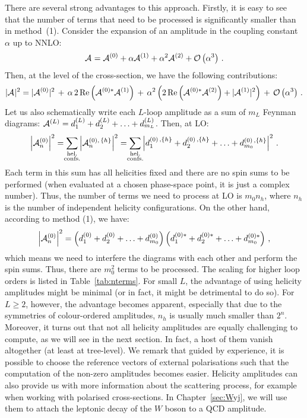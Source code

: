 \documentclass[main.tex]{subfiles}
\begin{document}
There are several strong advantages to this approach. Firstly, it is easy to see that the number of terms that need to be processed is significantly smaller than in method~(1). Consider the expansion of an amplitude in the coupling constant $\alpha$ up to NNLO:
\begin{equation}
    \mathcal{A}_{}^{} = \mathcal{A}_{}^{(0)} + \alpha \mathcal{A}_{}^{(1)} + \alpha^2 \mathcal{A}_{}^{(2)} + \mathcal{O}\left(\alpha^3\right) \,.
\end{equation}
Then, at the level of the cross-section, we have the following contributions:
\begin{equation}
    |\mathcal{A}_{}^{}|^2 = |\mathcal{A}_{}^{(0)}|^2 \,+\,\alpha\,2\,\mathrm{Re}\left(\mathcal{A}_{}^{(0)\ast}\mathcal{A}_{}^{(1)}\right) \,+\, \alpha^2 \left(2\,\mathrm{Re} \left(\mathcal{A}_{}^{(0)\ast}\mathcal{A}_{}^{(2)}\right) + |\mathcal{A}_{}^{(1)}|^2 \right) \,+\, \mathcal{O}\left(\alpha^3\right)\,.
\end{equation}
Let us also schematically write each $L$-loop amplitude as a sum of $m_L$ Feynman diagrams: $\mathcal{A}_{}^{(L)} = d^{(L)}_1 + d^{(L)}_2 + \ldots + d^{(L)}_{m_L}$. Then, at LO:
\begin{equation}
    \left|\ampl{n}{(0)}\right|^2 = \sum_{\mathclap{\substack{\text{hel.} \\ \text{confs.}}}} \left|\ampl{n}{(0),\,\{h\}} \right|^2 = \sum_{\mathclap{\substack{\text{hel.} \\ \text{confs.}}}} \left|d^{(0)\,,\{h\}}_1 + d^{(0)\,,\{h\}}_2 + \ldots + d^{(0)\,,\{h\}}_{m_0} \right|^2 \,.
\end{equation}
Each term in this sum has all helicities fixed and there are no spin sums to be performed (when evaluated at a chosen phase-space point, it is just a complex number). Thus, the number of terms we need to process at LO is $m_0 n_h$, where $n_h$ is the number of independent helicity configurations. On the other hand, according to method (1), we have:
\begin{equation}
    \left|\mathcal{A}_{n}^{(0)}\right|^2 = \left(d^{(0)}_1 + d^{(0)}_2 + \ldots + d^{(0)}_{m_0} \right) \left(d^{(0)\ast}_1 + d^{(0)\ast}_2 + \ldots + d^{(0)\ast}_{m_0} \right)\,,
\end{equation}
which means we need to interfere the diagrams with each other and perform the spin sums. Thus, there are $m_0^2$ terms to be processed. The scaling for higher loop orders is listed in Table~\ref{tab:nterms}. For small $L$, the advantage of using helicity amplitudes might be minimal (or in fact, it might be detrimental to do so). For $L\geq2$, however, the advantage becomes apparent, especially that due to the symmetries of colour-ordered amplitudes, $n_h$ is usually much smaller than $2^n$. Moreover, it turns out that not all helicity amplitudes are equally challenging to compute, as we will see in the next section. In fact, a host of them vanish altogether (at least at tree-level). We remark that guided by experience, it is possible to choose the reference vectors of external polarisations such that the computation of the non-zero amplitudes becomes easier. Helicity amplitudes can also provide us with more information about the scattering process, for example when working with polarised cross-sections. In Chapter~\ref{sec:Wyj}, we will use them to attach the leptonic decay of the $W$ boson to a QCD amplitude.
\end{document}
